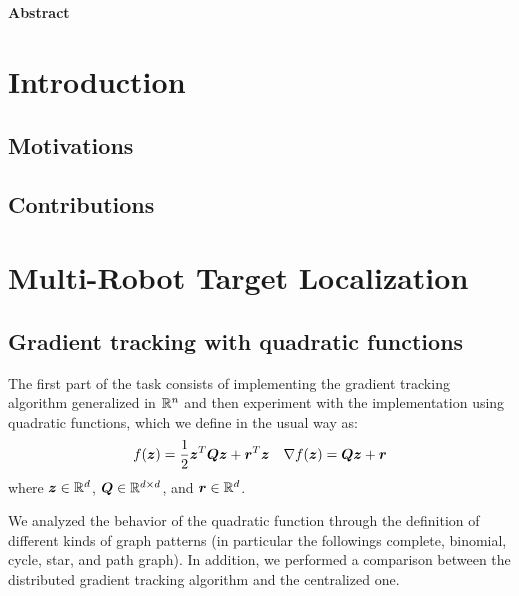 \documentclass[a4paper,11pt,oneside]{book}
\begin{document}
\newpage
\thispagestyle{empty}

\begin{center}
\chapter*{}
\thispagestyle{empty}
{\Huge \textbf{Abstract}}\\
\vspace{15mm}
\end{center}

\tableofcontents \thispagestyle{empty}

\chapter*{Introduction}
\section*{Motivations} 

\section*{Contributions}


\chapter{Multi-Robot Target Localization}

\section{Gradient tracking with quadratic functions}

The first part of the task consists of implementing the gradient tracking algorithm generalized in ${\mathbb{R}}^n$ and then experiment with the implementation using quadratic functions, which we define in the usual way as:
\[
      f({\bm{z}}) = \frac{1}{2} {\bm{z}}^T {\bm{Q}} {\bm{z}} + {\bm{r}}^T {\bm{z}}
      \quad
      \nabla f({\bm{z}}) = {\bm{Q}} {\bm{z}} + {\bm{r}}
\]
where ${\bm{z}} \in {\mathbb{R}}^{d}$, ${\bm{Q}} \in {\mathbb{R}}^{d \times d}$, and ${\bm{r}} \in {\mathbb{R}}^{d}$.

We analyzed the behavior of the quadratic function through the definition of different kinds of graph patterns (in particular the followings complete, binomial, cycle, star, and path graph). In addition, we performed a comparison between the distributed gradient tracking algorithm and the centralized one.
\end{document}
